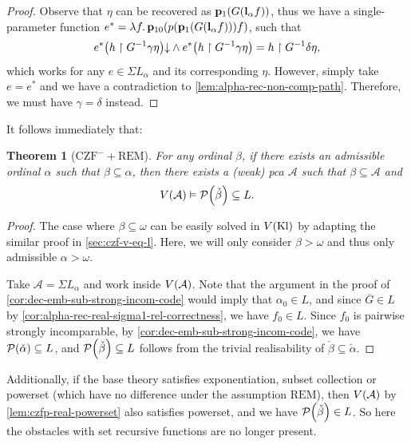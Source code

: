 \documentclass[12pt,openany]{book}
\theoremstyle{plain}
\newtheorem{theorem}{Theorem}[section]
\theoremstyle{definition}
\newcommand\uppar[1]{{\upshape(}#1{\upshape)}}
\newcommand\oplam[1]{\mathop{\lambda #1.}}
\newcommand\Pow{\mathcal{P}}
\newcommand\CZF{\mathrm{CZF}}
\newcommand\REM{\mathrm{REM}}
\newcommand\Kl{\mathrm{Kl}}
\newcommand\bp{\mathbf{p}}
\newcommand\bl{\mathbf{l}}
\begin{document}
\begin{proof}
  Observe that $\eta$ can be recovered as $\bp_1 \mleft(G \mleft(\bl_\alpha f\mright)\mright)$, thus we have a single-parameter function $e^* = \oplam{f} \bp_{10}\mleft(p \mleft(\bp_1 \mleft(G \mleft(\bl_\alpha f\mright)\mright)\mright) f\mright)$, such that
  \[e^* \mleft(h \upharpoonright G^{-1} \gamma \eta\mright) {\downarrow} \land e^* \mleft(h \upharpoonright G^{-1} \gamma \eta\mright) = h \upharpoonright G^{-1} \delta \eta,\]
  which works for any $e \in \Sigma L_\alpha$ and its corresponding $\eta$. However, simply take $e = e^*$ and we have a contradiction to \autoref{lem:alpha-rec-non-comp-path}. Therefore, we must have $\gamma = \delta$ instead.
\end{proof}

It follows immediately that:
\begin{theorem}[$\CZF^- + \REM$]
  \label{thm:alpha-rec-pow-in-l}
  For any ordinal $\beta$, if there exists an admissible ordinal $\alpha$ such that $\beta \subseteq \alpha$, then there exists a \uppar{weak} pca $\mathcal{A}$ such that $\beta \subseteq \mathcal{A}$ and
  \[V\mleft(\mathcal{A}\mright) \vDash \Pow\mleft(\check{\beta}\mright) \subseteq L.\]
\end{theorem}

\begin{proof}
  The case where $\beta \subseteq \omega$ can be easily solved in $V\mleft(\Kl\mright)$ by adapting the similar proof in \autoref{sec:czf-v-eq-l}. Here, we will only consider $\beta > \omega$ and thus only admissible $\alpha > \omega$.

  Take $\mathcal{A} = \Sigma L_\alpha$ and work inside $V\mleft(\mathcal{A}\mright)$. Note that the argument in the proof of \autoref{cor:dec-emb-sub-strong-incom-code} would imply that $\alpha_0 \in L$, and since $\overline{G} \in L$ by \autoref{cor:alpha-rec-real-sigma1-rel-correctness}, we have $f_0 \in L$. Since $f_0$ is pairwise strongly incomparable, by \autoref{cor:dec-emb-sub-strong-incom-code}, we have $\Pow\mleft(\check{\alpha}\mright) \subseteq L$, and $\Pow\mleft(\check{\beta}\mright) \subseteq L$ follows from the trivial realisability of $\check{\beta} \subseteq \check{\alpha}$.
\end{proof}

Additionally, if the base theory satisfies exponentiation, subset collection or powerset (which have no difference under the assumption $\REM$), then $V\mleft(\mathcal{A}\mright)$ by \autoref{lem:czfp-real-powerset} also satisfies powerset, and we have $\Pow\mleft(\check{\beta}\mright) \in L$. So here the obstacles with set recursive functions are no longer present.

\backmatter

\printindex

\bibmain
\end{document}
